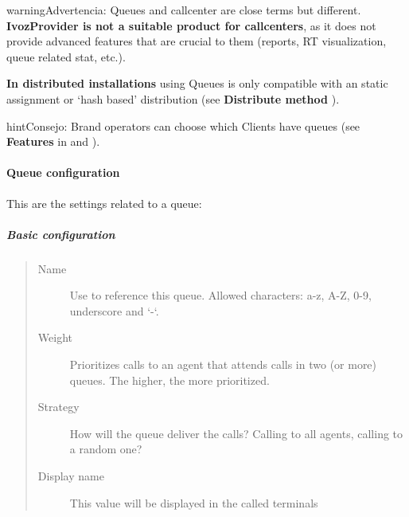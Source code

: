\documentclass[letterpaper,10pt,spanish]{sphinxmanual}
\begin{document}
\begin{notice}{warning}{Advertencia:}
Queues and callcenter are close terms but different. \textbf{IvozProvider
is not a suitable product for callcenters}, as it does not provide
advanced features that are crucial to them (reports, RT visualization,
queue related stat, etc.).
\end{notice}

\textbf{In distributed installations} using Queues is only compatible with an static
assignment or `hash based' distribution (see \textbf{Distribute method} {\hyperref[administration_portal/brand/clients/virtual_pbx:virtual\string-pbx]{}}).

\begin{notice}{hint}{Consejo:}
Brand operators can choose which Clients have queues (see \textbf{Features}
in {\hyperref[getting_started/internal_calls/brand_portal:brand\string-configuration]{}} and {\hyperref[getting_started/internal_calls/client_portal:client\string-configuration]{}}).
\end{notice}


\paragraph{Queue configuration}
\label{administration_portal/client/vpbx/routing_endpoints/queues:queue-configuration}
This are the settings related to a queue:


\subparagraph{Basic configuration}
\label{administration_portal/client/vpbx/routing_endpoints/queues:basic-configuration}\begin{quote}
\begin{description}
\item[{Name}] \leavevmode
Use to reference this queue. Allowed characters: a-z, A-Z, 0-9, underscore and `-`.

\item[{Weight}] \leavevmode
Prioritizes calls to an agent that attends calls in two (or more) queues. The
higher, the more prioritized.

\item[{Strategy}] \leavevmode
How will the queue deliver the calls? Calling to all agents, calling to a
random one?

\item[{Display name}] \leavevmode
This value will be displayed in the called terminals

\end{description}
\end{quote}
\end{document}
